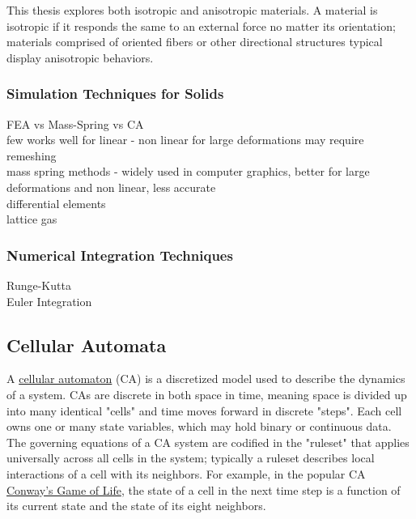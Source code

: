{This thesis explores both isotropic and anisotropic materials.  A material is isotropic if it responds the same to an external force no matter its orientation; materials comprised of oriented fibers or other directional structures typical display anisotropic behaviors.  

\subsubsection{Simulation Techniques for Solids}


FEA vs Mass-Spring vs CA\\
few works well for linear - non linear for large deformations may require remeshing\\
mass spring methods - widely used in computer graphics, better for large deformations and non linear, less accurate\\
differential elements\\
lattice gas\\

\subsubsection{Numerical Integration Techniques}

Runge-Kutta\\
Euler Integration\\

\subsection{Cellular Automata}

A \href{https://en.wikipedia.org/wiki/Cellular_automaton}{cellular automaton} (CA) is a discretized model used to describe the dynamics of a system.  CAs are discrete in both space in time, meaning space is divided up into many identical "cells" and time moves forward in discrete "steps".  Each cell owns one or many state variables, which may hold binary or continuous data.  
The governing equations of a CA system are codified in the "ruleset" that applies universally across all cells in the system; typically a ruleset describes local interactions of a cell with its neighbors.  For example, in the popular CA \href{https://en.wikipedia.org/wiki/Conway's_Game_of_Life}{Conway's Game of Life}, the state of a cell in the next time step is a function of its current state and the state of its eight neighbors.\\

}
